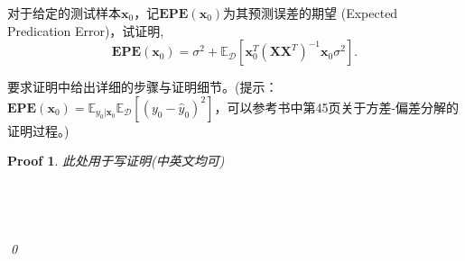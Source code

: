 \documentclass[a4paper,UTF8]{article}
\numberwithin{equation}{section}
\newtheorem*{myProof}{Proof}
\begin{document}
对于给定的测试样本$\textbf{x}_0$，记$\mathbf{EPE}(\textbf{x}_0)$为其预测误差的期望 (Expected Predication Error)，试证明,
\[
	\mathbf{EPE}(\textbf{x}_0) = \sigma^2+\mathbb{E}_{\mathcal{D}}[\textbf{x}_0^T(\textbf{X}\textbf{X}^T)^{-1}\textbf{x}_0\sigma^2].
\]

要求证明中给出详细的步骤与证明细节。(提示：$\mathbf{EPE}(\textbf{x}_0)=\mathbb{E}_{y_0|\textbf{x}_0} \mathbb{E}_{\mathcal{D}}[(y_0-\hat{y}_0)^2]$，可以参考书中第45页关于方差-偏差分解的证明过程。)

\begin{myProof}
此处用于写证明(中英文均可)
~\\
~\\
~\\
~\\
~\\

\qed
\end{myProof}
\end{document}
